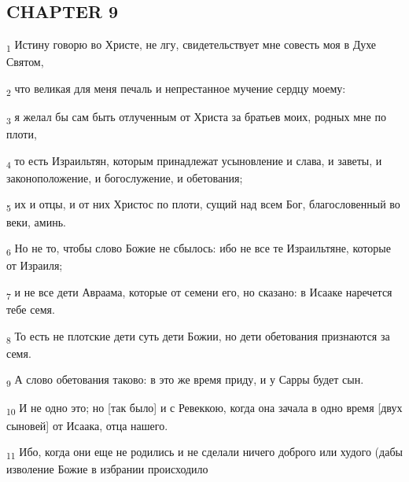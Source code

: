 \subsection{CHAPTER 9}
\begin{tcolorbox}
\textsubscript{1} Истину говорю во Христе, не лгу, свидетельствует мне совесть моя в Духе Святом,
\end{tcolorbox}
\begin{tcolorbox}
\textsubscript{2} что великая для меня печаль и непрестанное мучение сердцу моему:
\end{tcolorbox}
\begin{tcolorbox}
\textsubscript{3} я желал бы сам быть отлученным от Христа за братьев моих, родных мне по плоти,
\end{tcolorbox}
\begin{tcolorbox}
\textsubscript{4} то есть Израильтян, которым принадлежат усыновление и слава, и заветы, и законоположение, и богослужение, и обетования;
\end{tcolorbox}
\begin{tcolorbox}
\textsubscript{5} их и отцы, и от них Христос по плоти, сущий над всем Бог, благословенный во веки, аминь.
\end{tcolorbox}
\begin{tcolorbox}
\textsubscript{6} Но не то, чтобы слово Божие не сбылось: ибо не все те Израильтяне, которые от Израиля;
\end{tcolorbox}
\begin{tcolorbox}
\textsubscript{7} и не все дети Авраама, которые от семени его, но сказано: в Исааке наречется тебе семя.
\end{tcolorbox}
\begin{tcolorbox}
\textsubscript{8} То есть не плотские дети суть дети Божии, но дети обетования признаются за семя.
\end{tcolorbox}
\begin{tcolorbox}
\textsubscript{9} А слово обетования таково: в это же время приду, и у Сарры будет сын.
\end{tcolorbox}
\begin{tcolorbox}
\textsubscript{10} И не одно это; но [так было] и с Ревеккою, когда она зачала в одно время [двух сыновей] от Исаака, отца нашего.
\end{tcolorbox}
\begin{tcolorbox}
\textsubscript{11} Ибо, когда они еще не родились и не сделали ничего доброго или худого (дабы изволение Божие в избрании происходило
\end{tcolorbox}
